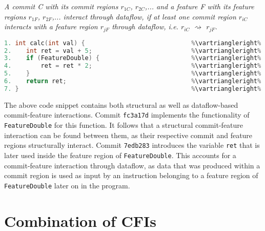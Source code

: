 \begin{definition}\label{def:dataflow_cfi}
\emph{A commit C with its commit regions $r_{1C}$, $r_{2C}$,... and a feature F with its feature regions $r_{1F}$, $r_{2F}$,... interact through dataflow, if at least one commit region $r_{iC}$ interacts with a feature region $r_{jF}$ through dataflow, i.e. $r_{iC}$ $\rightsquigarrow$ $r_{jF}$.}
\end{definition}

\begin{lstlisting}[language=C++, caption={Illustration of structural and dataflow-based CFIs}, label=DescriptiveLabel]	
1. int calc(int val) {                             %\vartriangleright% %\texttt{d93df4a}%
2.    int ret = val + 5;                           %\vartriangleright% %\texttt{7edb283}%
3.    if (FeatureDouble) {                         %\vartriangleright% %\texttt{fc3a17d}%    %\vartriangleright% %FeatureDouble%
4.        ret = ret * 2;                           %\vartriangleright% %\texttt{fc3a17d}%    %\vartriangleright% %FeatureDouble%
5.    }                                            %\vartriangleright% %\texttt{fc3a17d}%    %\vartriangleright% %FeatureDouble%
6.    return ret;                                  %\vartriangleright% %\texttt{d93df4a}%   
7. }                                               %\vartriangleright% %\texttt{d93df4a}%   
\end{lstlisting}
\textsf{The above code snippet contains both structural as well as dataflow-based commit-feature interactions.
Commit \texttt{fc3a17d} implements the functionality of \texttt{FeatureDouble} for this function.
It follows that a structural commit-feature interaction can be found between them, as their respective commit and feature regions structurally interact.
Commit \texttt{7edb283} introduces the variable \texttt{ret} that is later used inside the feature region of \texttt{FeatureDouble}. 
This accounts for a commit-feature interaction through dataflow, as data that was produced within a commit region is used as input 
by an instruction belonging to a feature region of \texttt{FeatureDouble} later on in the program.}

\section{Combination of CFIs}\label{sec:combination_cfis}

